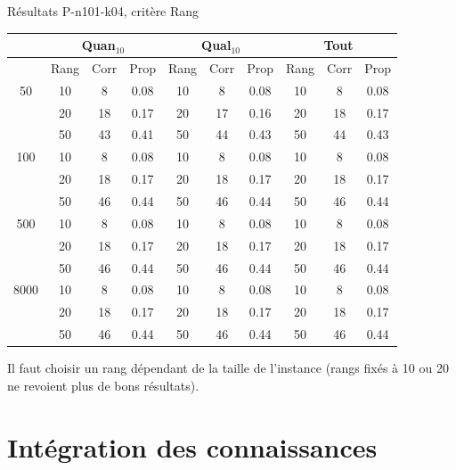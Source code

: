 \documentclass{beamer}
\begin{document}
\begin{frame}{Résultats P-n101-k04, critère Rang}
\begin{table}[H]

\begin{tabular}{|@{}c@{}|@{}c@{}|@{}c@{}|@{}c@{}||@{}c@{}|@{}c@{}|@{}c@{}||@{}c@{}|@{}c@{}|@{}c@{}|}

\hline
 & \multicolumn{3}{c|}{Quan$_{10}$} & \multicolumn{3}{c|}{Qual$_{10}$} & \multicolumn{3}{c|}{Tout} \\
 \hline
 & Rang & Corr & Prop & Rang & Corr & Prop & Rang & Corr & Prop \\
 \hline
 50 & 10  & 8 & 0.08 & 10  & 8 & 0.08 & 10  & 8 & 0.08 \\
 \cline{2-10} 
    & 20 & 18 & 0.17 & 20  & 17 & 0.16 & 20 & 18 & 0.17  \\
 \cline{2-10} 
    & 50 & 43 & 0.41 & 50 & 44 & 0.43 & 50 & 44 & 0.43  \\
  \hline
   100 & 10  & 8 & 0.08 & 10  & 8 & 0.08 & 10  & 8 & 0.08  \\
 \cline{2-10} 
    & 20 & 18 & 0.17 & 20 & 18 & 0.17 & 20 & 18 & 0.17  \\
  \cline{2-10} 
    & 50 & 46 & 0.44 & 50 & 46 & 0.44 & 50 & 46 & 0.44  \\
  \hline
   500 & 10  & 8 & 0.08 & 10  & 8 & 0.08 & 10  & 8 & 0.08  \\
 \cline{2-10} 
    & 20 & 18 & 0.17 & 20 & 18 & 0.17 & 20 & 18 & 0.17  \\
  \cline{2-10} 
    & 50 & 46 & 0.44 & 50 & 46 & 0.44 & 50 & 46 & 0.44  \\
  \hline
   8000 & 10  & 8 & 0.08 & 10  & 8 & 0.08 & 10  & 8 & 0.08  \\
 \cline{2-10} 
    & 20 & 18 & 0.17 & 20 & 18 & 0.17 & 20 & 18 & 0.17  \\
  \cline{2-10} 
    & 50 & 46 & 0.44 & 50 & 46 & 0.44 & 50 & 46 & 0.44  \\
  \hline

\end{tabular}
\end{table}
Il faut choisir un rang dépendant de la taille de l'instance (rangs fixés à 10 ou 20 ne revoient plus de bons résultats).
\end{frame}

\section{Intégration des connaissances}
\end{document}
